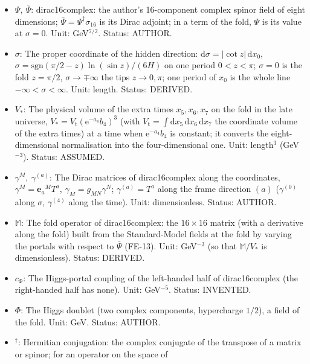 \documentclass[
  10pt,
]{article}
\providecommand{\tightlist}{%
  \setlength{\itemsep}{0pt}\setlength{\parskip}{0pt}}
\begin{document}
\begin{itemize}
\tightlist
\item
  \(\Psi,\ \bar\Psi\): dirac16complex: the author's 16-component complex
  spinor field of eight dimensions;
  \(\bar\Psi = \Psi^\dagger\sigma_{16}\) is its Dirac adjoint; in a term
  of the fold, \(\Psi\) is its value at \(\sigma = 0\). Unit:
  GeV\(^{7/2}\). Status: AUTHOR.
\item
  \(\sigma\): The proper coordinate of the hidden direction:
  \(\mathrm{d}\sigma = \lvert\cot z\rvert\,\mathrm{d}x_0\),
  \(\sigma = \mathrm{sgn}(\pi/2 - z)\ln(\sin z)/(6H)\) on one period
  \(0 < z < \pi\); \(\sigma = 0\) is the fold \(z = \pi/2\),
  \(\sigma \to \mp\infty\) the tips \(z \to 0, \pi\); one period of
  \(x_0\) is the whole line \(-\infty < \sigma < \infty\). Unit: length.
  Status: DERIVED.
\item
  \(V_*\): The physical volume of the extra times \(x_5, x_6, x_7\) on
  the fold in the late universe,
  \(V_* = V_{\mathrm{t}}(\mathrm{e}^{-a_4}b_4)^3\) (with
  \(V_{\mathrm{t}} = \int\mathrm{d}x_5\,\mathrm{d}x_6\,\mathrm{d}x_7\)
  the coordinate volume of the extra times) at a time when
  \(\mathrm{e}^{-a_4}b_4\) is constant; it converts the
  eight-dimensional normalisation into the four-dimensional one. Unit:
  length\(^3\) (GeV\(^{-3}\)). Status: ASSUMED.
\item
  \(\gamma^M,\ \gamma^{(a)}\): The Dirac matrices of dirac16complex
  along the coordinates, \(\gamma^M = \mathbf{e}_a{}^MT^a\),
  \(\gamma_M = g_{MN}\gamma^N\); \(\gamma^{(a)} = T^a\) along the frame
  direction \((a)\) (\(\gamma^{(0)}\) along \(\sigma\), \(\gamma^{(4)}\)
  along the time). Unit: dimensionless. Status: AUTHOR.
\item
  \(\mathbb{M}\): The fold operator of dirac16complex: the
  \(16 \times 16\) matrix (with a derivative along the fold) built from
  the Standard-Model fields at the fold by varying the portals with
  respect to \(\bar\Psi\) (FE-13). Unit: GeV\(^{-3}\) (so that
  \(\mathbb{M}/V_*\) is dimensionless). Status: DERIVED.
\item
  \(c_\Phi\): The Higgs-portal coupling of the left-handed half of
  dirac16complex (the right-handed half has none). Unit: GeV\(^{-5}\).
  Status: INVENTED.
\item
  \(\Phi\): The Higgs doublet (two complex components, hypercharge
  \(1/2\)), a field of the fold. Unit: GeV. Status: AUTHOR.
\item
  \({}^\dagger\): Hermitian conjugation: the complex conjugate of the
  transpose of a matrix or spinor; for an operator on the space of

\end{itemize}
\end{document}
